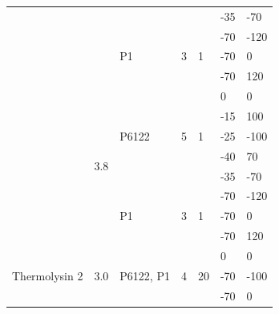 \begin{table}[]
{\begin{tabular}{@{}lllllll@{}}
                           &                      &                           &                    &                    & -35   & -70  \\
                           &                      & \multirow{3}{*}{P1}       & \multirow{3}{*}{3} & \multirow{3}{*}{1} & -70   & -120 \\
                           &                      &                           &                    &                    & -70   & 0    \\
                           &                      &                           &                    &                    & -70   & 120  \\ \cmidrule(l){2-7} 
                           & \multirow{8}{*}{3.8} & \multirow{5}{*}{P6122}    & \multirow{5}{*}{5} & \multirow{5}{*}{1} & 0     & 0    \\
                           &                      &                           &                    &                    & -15   & 100  \\
                           &                      &                           &                    &                    & -25   & -100 \\
                           &                      &                           &                    &                    & -40   & 70   \\
                           &                      &                           &                    &                    & -35   & -70  \\ \cmidrule(l){3-7} 
                           &                      & \multirow{3}{*}{P1}       & \multirow{3}{*}{3} & \multirow{3}{*}{1} & -70   & -120 \\
                           &                      &                           &                    &                    & -70   & 0    \\
                           &                      &                           &                    &                    & -70   & 120  \\ \midrule
\multirow{9}{*}{Thermolysin 2}  & \multirow{4}{*}{3.0} & \multirow{4}{*}{P6122, P1} & \multirow{4}{*}{4} & \multirow{4}{*}{20} & 0   & 0    \\
                           &                      &                           &                    &                    & -70   & -100 \\
                           &                      &                           &                    &                    & -70   & 0    \\

\end{tabular}}
\end{table}
